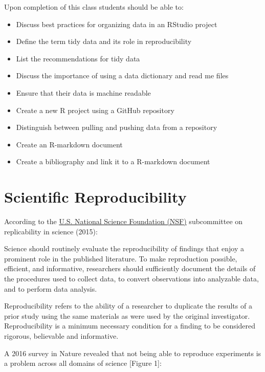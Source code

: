 \documentclass[
]{article}
\providecommand{\tightlist}{%
  \setlength{\itemsep}{0pt}\setlength{\parskip}{0pt}}
\begin{document}
Upon completion of this class students should be able to:

\begin{itemize}
\tightlist
\item
  Discuss best practices for organizing data in an RStudio project
\item
  Define the term tidy data and its role in reproducibility
\item
  List the recommendations for tidy data
\item
  Discuss the importance of using a data dictionary and read me files
\item
  Ensure that their data is machine readable
\item
  Create a new R project using a GitHub repository
\item
  Distinguish between pulling and pushing data from a repository
\item
  Create an R-markdown document
\item
  Create a bibliography and link it to a R-markdown document
\end{itemize}

\hypertarget{scientific-reproducibility}{%
\section{Scientific Reproducibility}\label{scientific-reproducibility}}

According to the
\href{https://www.nsf.gov/sbe/AC_Materials/SBE_Robust_and_Reliable_Research_Report.pdf}{U.S.
National Science Foundation (NSF)} subcommittee on replicability in
science (2015):

Science should routinely evaluate the reproducibility of findings that
enjoy a prominent role in the published literature. To make reproduction
possible, efficient, and informative, researchers should sufficiently
document the details of the procedures used to collect data, to convert
observations into analyzable data, and to perform data analysis.

Reproducibility refers to the ability of a researcher to duplicate the
results of a prior study using the same materials as were used by the
original investigator. Reproducibility is a minimum necessary condition
for a finding to be considered rigorous, believable and informative.

A 2016 survey in Nature revealed that not being able to reproduce
experiments is a problem across all domains of science {[}Figure 1{]}:
\end{document}
